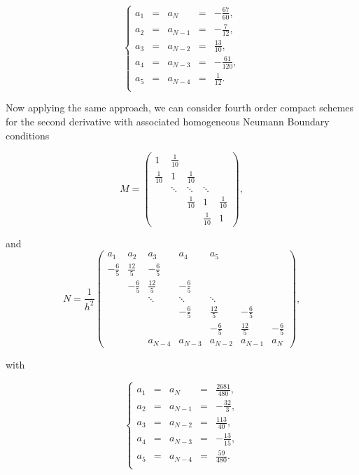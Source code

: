 \documentclass[11pt]{article}
\begin{document}
{$$ \left\lbrace \begin{array}{rcccl}
a_1&=&a_{N}&=&-\frac{67}{60},   \\
a_2&=&a_{N-1}&=&-\frac{7}{12},   \\
a_3&=&a_{N-2}&=&\frac{13}{10},   \\
a_4&=&a_{N-3}&=&-\frac{61}{120},   \\
a_5&=&a_{N-4}&=&\frac{1}{12}.   \\
\end{array}  \right.  $$

Now applying the same approach, we can consider fourth order compact schemes for the second derivative with associated homogeneous Neumann Boundary conditions

$$ M= \begin{pmatrix}
1 & \frac{1}{10} &   &   &   \\ 
\frac{1}{10} & 1 & \frac{1}{10} &   &   \\ 
  & \ddots & \ddots & \ddots &   \\ 
  &  & \frac{1}{10} & 1 & \frac{1}{10} \\ 
 &  &  & \frac{1}{10} & 1
\end{pmatrix}, $$ 

and $$ N = \frac{1}{h^2} \begin{pmatrix}
a_1 & a_2 & a_3 & a_4 & a_5 &   &   \\ 
-\frac{6}{5} & \frac{12}{5} & -\frac{6}{5} &   &   &   &   \\ 
  & -\frac{6}{5} & \frac{12}{5} & -\frac{6}{5} &   &   &   \\ 
  &   & \ddots & \ddots & \ddots &   &   \\ 
  &   &   & -\frac{6}{5} & \frac{12}{5} & -\frac{6}{5} &   \\ 
  &   &   &   & -\frac{6}{5} & \frac{12}{5} & -\frac{6}{5} \\ 
  &   & a_{N-4} & a_{N-3} & a_{N-2} & a_{N-1} & a_N
\end{pmatrix}, $$

with

$$ \left\lbrace \begin{array}{rcccl}
a_1&=&a_{N}&=&\frac{2681}{480},   \\
a_2&=&a_{N-1}&=&-\frac{32}{3},   \\
a_3&=&a_{N-2}&=&\frac{113}{40},   \\
a_4&=&a_{N-3}&=&-\frac{13}{15},   \\
a_5&=&a_{N-4}&=&\frac{59}{480}.   \\
\end{array}  \right.  $$


}
\end{document}
